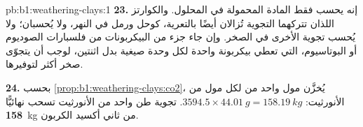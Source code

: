 \begin{solution}{pb:b1:weathering-clays:1}
\textbf{23.} إنه يحسب فقط المادة المحمولة في المحلول.  والكوارتز اللذان تتركهما التجوية تُزالان أيضًا بالتعرية، كوحل ورمل في النهر، ولا يُحسبان؛ ولا يُحسب تجوية  الأخرى في الصخر. وإن جاء جزء من البيكربونات من فلسبارات الصوديوم أو البوتاسيوم، التي تعطي بيكربونة واحدة لكل وحدة صيغية بدل اثنتين، لوجب أن يتجوّى صخر أكثر لتوفيرها.

\textbf{24.} بحسب \cref{prop:b1:weathering-clays:co2}، يُخزَّن مول واحد من  لكل مول من الأنورثيت: $3594.5 \times \qty{44.01}{g} = \qty{158.19}{kg}$.
تجوية طن واحد من الأنورثيت تسحب نهائيًّا \textbf{158}~kg من ثاني أكسيد الكربون.
\end{solution}
